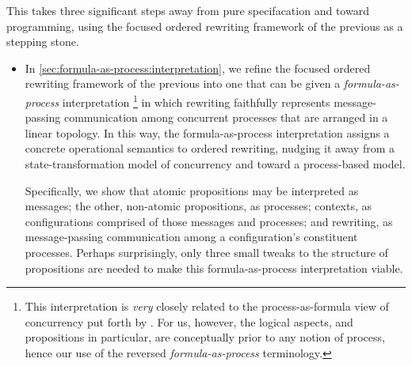 This  takes three significant steps away from pure specifacation and toward programming, using the focused ordered rewriting framework of the previous  as a stepping stone.
\begin{itemize}[listparindent=\parindent, itemsep=\dimexpr\itemsep+\parsep\relax, parsep=0pt]
\item
  In \cref{sec:formula-as-process:interpretation}, we refine the focused ordered rewriting framework of the previous  into one that can be given a \emph{formula-as-process} interpretation%
  \footnote{This interpretation is \emph{very} closely related to the process-as-formula view of concurrency put forth by \textcites{Miller:ELP92}{Cervesato+Scedrov:IC09}.
    For us, however, the logical aspects, and propositions in particular, are conceptually prior to any notion of process, hence our use of the reversed \emph{formula-as-process} terminology.}
  in which rewriting faithfully represents message-passing communication among concurrent processes that are arranged in a linear topology.
  In this way, the formula-as-process interpretation assigns a concrete operational semantics to ordered rewriting, nudging it away from a state-transformation model of concurrency and toward a process-based model.

  Specifically, we show that atomic propositions may be interpreted as messages;
  the other, non-atomic propositions, as processes;
  contexts, as configurations comprised of those messages and processes;
  and
  rewriting, as mes\-sage-passing communication among a configuration's con\-stit\-u\-ent processes.
  Perhaps surprisingly, only three small tweaks to the structure of propositions are needed to make this formula-as-process interpretation viable.




\end{itemize}
